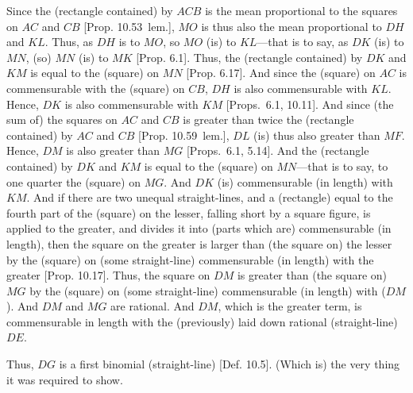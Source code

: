 \begin{Parallel}{}{}
{Since the (rectangle contained) by $ACB$ is the mean proportional to
 the squares on $AC$ and $CB$ [Prop. 10.53~lem.], $MO$ is thus also the
mean proportional to   $DH$ and $KL$. Thus,
as $DH$ is to $MO$, so $MO$ (is) to $KL$---that is to say, as $DK$
(is) to $MN$, (so) $MN$ (is) to $MK$ [Prop. 6.1].
Thus, the (rectangle contained) by $DK$ and $KM$ is equal
to the (square) on $MN$ [Prop. 6.17]. And since
the (square) on $AC$ is commensurable with the (square) on $CB$,
$DH$ is also commensurable with $KL$. Hence, $DK$
is also commensurable with $KM$ [Props.~6.1, 10.11].
And since (the sum of) the squares on $AC$ and $CB$ is greater
than twice the (rectangle contained) by $AC$ and $CB$ [Prop. 10.59~lem.], $DL$ (is) thus also
greater than $MF$. Hence, $DM$ is also greater than $MG$
[Props.~6.1, 5.14]. And
the (rectangle contained) by $DK$ and $KM$ is equal to
the (square) on $MN$---that is to say, to one quarter the (square) on $MG$.
And $DK$ (is) commensurable (in length) with $KM$. And if there are
two unequal straight-lines, and a (rectangle) equal to the fourth part
of the (square) on the lesser, falling short by a square figure, is applied to
the greater, and divides it into (parts which are) commensurable (in length),
then the square on the greater is larger than (the square on) the lesser by
the (square) on (some straight-line) commensurable (in length) with the greater [Prop. 10.17]. Thus,  the square on $DM$
is greater than (the square on) $MG$ by the (square) on (some straight-line)
commensurable (in length) with ($DM$). And $DM$ and $MG$ are rational. And
$DM$, which is the greater term, is commensurable in length with the (previously) laid down rational (straight-line) $DE$.

Thus, $DG$ is a first binomial (straight-line) [Def. 10.5]. (Which is) the very thing it was required to show.}
\end{Parallel}


\vspace{7pt}{\footnotesize\noindent$^\dag$ In other words, the square of a binomial  is a
first binomial. See Prop.~10.54.}

